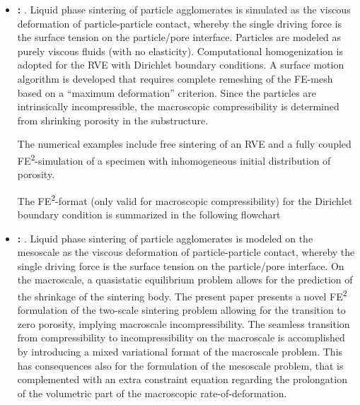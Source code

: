 \documentclass[MikaelDissertation.tex]{subfiles}
\begin{document}
\begin{itemize}
 \item \textbf{: }.
Liquid phase sintering of particle agglomerates is simulated as the viscous deformation of particle-particle contact, whereby the single driving force is the surface tension on the particle/pore interface.
Particles are modeled as purely viscous fluids (with no elasticity). 
Computational homogenization is adopted for the RVE with Dirichlet boundary conditions.
A surface motion algorithm is developed that requires complete remeshing of the FE-mesh based on a ``maximum deformation'' criterion. 
Since the particles are intrinsically incompressible, the macroscopic compressibility is determined from shrinking porosity in the substructure.

The numerical examples include free sintering of an RVE and a fully coupled FE\textsuperscript{2}-simulation of a specimen with inhomogeneous initial distribution of porosity.

The FE\textsuperscript{2}-format (only valid for macroscopic compressibility) for the Dirichlet boundary condition is summarized in the following flowchart
\begin{center}
  
\end{center}

 \item \textbf{: }.
Liquid phase sintering of particle agglomerates is modeled on the mesoscale as the viscous deformation of particle-particle contact, whereby the single driving force is the surface tension on the particle/pore interface.
On the macroscale, a quasistatic equilibrium problem allows for the prediction of the shrinkage of the sintering body. 
The present paper presents a novel FE\textsuperscript{2} formulation of the two-scale sintering problem allowing for the transition to zero porosity, implying macroscale incompressibility.
The seamless transition from compressibility to incompressibility on the macroscale is accomplished by introducing a mixed variational format of the macroscale problem.
This has consequences also for the formulation of the mesoscale problem, that is complemented with an extra constraint equation regarding the prolongation of the volumetric part of the macroscopic rate-of-deformation.


\end{itemize}
\end{document}
